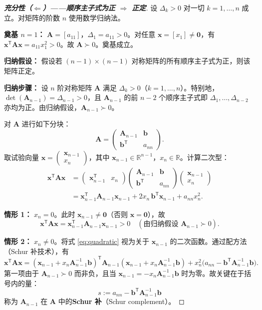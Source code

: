 \documentclass[12pt,a4paper]{article}
\theoremstyle{mystyle}
\theoremstyle{proofstyle}
\newtheorem*{proof}{证明}
\theoremstyle{definition}
\theoremstyle{remark}
\newcommand{\R}{\mathbb{R}}
\newcommand{\T}{^{\mathsf{T}}}
\newcommand{\x}{\mathbf{x}}
\newcommand{\A}{\mathbf{A}}
\newcommand{\zero}{\mathbf{0}}
\begin{document}
\begin{proof}[\textbf{充分性（$\Longleftarrow$）——顺序主子式为正 $\Rightarrow$ 正定}]

设 $\Delta_k > 0$ 对一切 $k = 1,\dots,n$ 成立。对矩阵的阶数 $n$ 使用数学归纳法。

\textbf{奠基 $n=1$：} $\A = [a_{11}]$，$\Delta_1 = a_{11} > 0$。对任意 $\x = [x_1] \neq \zero$，有 $\x\T\A\x = a_{11}x_1^2 > 0$。故 $\A \succ 0$。奠基成立。

\textbf{归纳假设：} 假设若 $(n-1)\times(n-1)$ 对称矩阵的所有顺序主子式为正，则该矩阵正定。

\textbf{归纳步骤：} 设 $n$ 阶对称矩阵 $\A$ 满足 $\Delta_k > 0$（$k=1,\dots,n$）。特别地，$\det(\A_{n-1}) = \Delta_{n-1} > 0$，且 $\A_{n-1}$ 的前 $n-2$ 个顺序主子式即 $\Delta_1,\dots,\Delta_{n-2}$ 亦均为正。由归纳假设，$\A_{n-1} \succ 0$。

对 $\A$ 进行如下分块：
\[
    \A = \begin{pmatrix}
        \A_{n-1} & \mathbf{b} \\
        \mathbf{b}\T & a_{nn}
    \end{pmatrix}.
\]
取试验向量 $\x = \begin{pmatrix} \x_{n-1} \\ x_n \end{pmatrix}$，其中 $\x_{n-1} \in \R^{n-1}$，$x_n \in \R$。计算二次型：
\begin{align}
    \x\T\A\x &= \begin{pmatrix} \x_{n-1}\T & x_n \end{pmatrix}
               \begin{pmatrix} \A_{n-1} & \mathbf{b} \\ \mathbf{b}\T & a_{nn} \end{pmatrix}
               \begin{pmatrix} \x_{n-1} \\ x_n \end{pmatrix} \nonumber \\
             &= \x_{n-1}\T\A_{n-1}\x_{n-1} + 2x_n\,\mathbf{b}\T\x_{n-1} + a_{nn}x_n^2. \label{eq:quadratic}
\end{align}

\textbf{情形 1：} $x_n = 0$。此时 $\x_{n-1} \neq \zero$（否则 $\x = \zero$），故
\[
    \x\T\A\x = \x_{n-1}\T\A_{n-1}\x_{n-1} > 0 \quad (\text{由归纳假设 } \A_{n-1} \succ 0).
\]

\textbf{情形 2：} $x_n \neq 0$。将式 \eqref{eq:quadratic} 视为关于 $\x_{n-1}$ 的二次函数。通过配方法（Schur 补技术），有
\[
    \x\T\A\x = (\x_{n-1} + x_n\A_{n-1}^{-1}\mathbf{b})\T\A_{n-1}(\x_{n-1} + x_n\A_{n-1}^{-1}\mathbf{b})
              + x_n^2\big(a_{nn} - \mathbf{b}\T\A_{n-1}^{-1}\mathbf{b}\big).
\]
第一项由于 $\A_{n-1} \succ 0$ 而非负，且当 $\x_{n-1} = -x_n\A_{n-1}^{-1}\mathbf{b}$ 时为零。故关键在于括号内的量：
\[
    s := a_{nn} - \mathbf{b}\T\A_{n-1}^{-1}\mathbf{b}
\]
称为 $\A_{n-1}$ 在 $\A$ 中的\textbf{Schur 补}（Schur complement）。


\end{proof}
\end{document}
